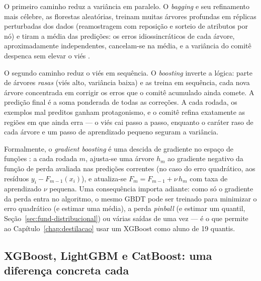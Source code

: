 O primeiro caminho reduz a variância em paralelo. O \emph{bagging} e
seu refinamento mais célebre, as florestas aleatórias, treinam muitas
árvores profundas em réplicas perturbadas dos dados (reamostragem com
reposição e sorteio de atributos por nó) e tiram a média das predições: os
erros idiossincráticos de cada árvore, aproximadamente independentes,
cancelam-se na média, e a variância do comitê despenca sem elevar o viés
\citep{breiman2001}.

O segundo caminho reduz o viés em sequência. O \emph{boosting}
inverte a lógica: parte de árvores \emph{rasas} (viés alto, variância
baixa) e as treina em sequência, cada nova árvore concentrada em corrigir
os erros que o comitê acumulado ainda comete. A predição final é a soma
ponderada de todas as correções. A cada rodada, os exemplos mal preditos
ganham protagonismo, e o comitê refina exatamente as regiões em que ainda
erra --- o viés cai passo a passo, enquanto o caráter raso de cada árvore e um
passo de aprendizado pequeno seguram a
variância.

Formalmente, o \emph{gradient boosting} é uma descida de gradiente no
espaço de funções \citep{friedman2001}: a cada rodada $m$, ajusta-se
uma árvore $h_m$ ao gradiente negativo da função de perda avaliada nas
predições correntes (no caso do erro quadrático, aos resíduos
$y_i - F_{m-1}(x_i)$), e atualiza-se $F_m = F_{m-1} + \nu\, h_m$ com
taxa de aprendizado $\nu$ pequena. Uma consequência importa adiante:
como só o gradiente da perda entra no algoritmo, o mesmo GBDT pode ser
treinado para minimizar o erro quadrático (e estimar uma média), a
perda \emph{pinball} (e estimar um quantil,
Seção~\ref{sec:fund-distribucional}) ou várias saídas de uma vez ---
é o que permite ao Capítulo~\ref{chap:destilacao} usar um XGBoost
como aluno de 19 quantis.

\subsection{XGBoost, LightGBM e CatBoost: uma diferença concreta cada}

